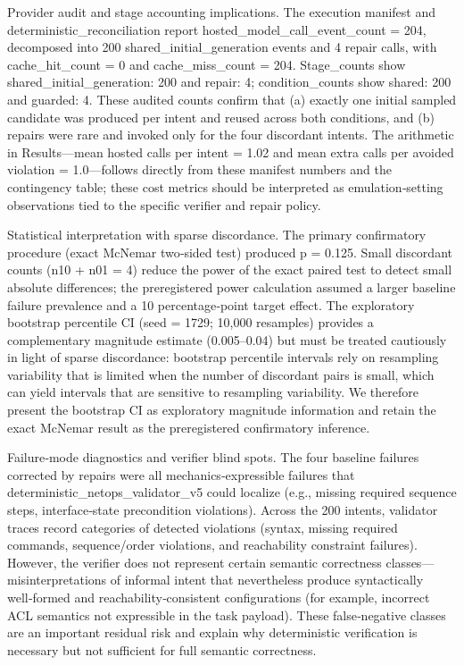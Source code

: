 \documentclass[conference]{IEEEtran}
\begin{document}
Provider audit and stage accounting implications. The execution manifest and deterministic\_reconciliation report hosted\_model\_call\_event\_count = 204, decomposed into 200 shared\_initial\_generation events and 4 repair calls, with cache\_hit\_count = 0 and cache\_miss\_count = 204. Stage\_counts show shared\_initial\_generation: 200 and repair: 4; condition\_counts show shared: 200 and guarded: 4. These audited counts confirm that (a) exactly one initial sampled candidate was produced per intent and reused across both conditions, and (b) repairs were rare and invoked only for the four discordant intents. The arithmetic in Results---mean hosted calls per intent = 1.02 and mean extra calls per avoided violation = 1.0---follows directly from these manifest numbers and the contingency table; these cost metrics should be interpreted as emulation‑setting observations tied to the specific verifier and repair policy.

Statistical interpretation with sparse discordance. The primary confirmatory procedure (exact McNemar two‑sided test) produced p = 0.125. Small discordant counts (n10 + n01 = 4) reduce the power of the exact paired test to detect small absolute differences; the preregistered power calculation assumed a larger baseline failure prevalence and a 10 percentage‑point target effect. The exploratory bootstrap percentile CI (seed = 1729; 10,000 resamples) provides a complementary magnitude estimate (0.005--0.04) but must be treated cautiously in light of sparse discordance: bootstrap percentile intervals rely on resampling variability that is limited when the number of discordant pairs is small, which can yield intervals that are sensitive to resampling variability. We therefore present the bootstrap CI as exploratory magnitude information and retain the exact McNemar result as the preregistered confirmatory inference.

Failure‑mode diagnostics and verifier blind spots. The four baseline failures corrected by repairs were all mechanics‑expressible failures that deterministic\_netops\_validator\_v5 could localize (e.g., missing required sequence steps, interface‑state precondition violations). Across the 200 intents, validator traces record categories of detected violations (syntax, missing required commands, sequence/order violations, and reachability constraint failures). However, the verifier does not represent certain semantic correctness classes---misinterpretations of informal intent that nevertheless produce syntactically well‑formed and reachability‑consistent configurations (for example, incorrect ACL semantics not expressible in the task payload). These false‑negative classes are an important residual risk and explain why deterministic verification is necessary but not sufficient for full semantic correctness.
\end{document}
